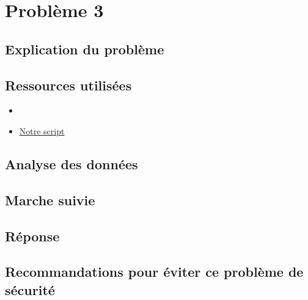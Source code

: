 \section{Problème 3}

\subsection{Explication du problème}

\subsection{Ressources utilisées}

\begin{itemize}
    \item 
    \item \href{}{Notre script}
\end{itemize}

\subsection{Analyse des données}

\subsection{Marche suivie}

\subsection{Réponse}

\subsection{Recommandations pour éviter ce problème de sécurité}
